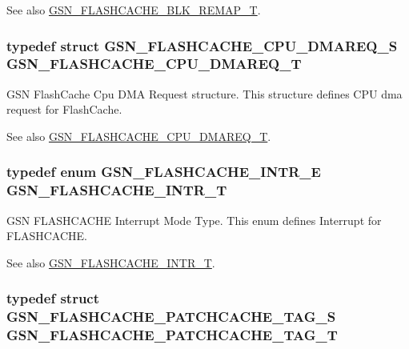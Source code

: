 \begin{DoxySeeAlso}{See also}
\hyperlink{a00646_gaae9fda1c44c958d868f7cf116897bfc5}{GSN\_\-FLASHCACHE\_\-BLK\_\-REMAP\_\-T}. 
\end{DoxySeeAlso}
\hypertarget{a00646_ga83166ab55332496f41890f891c0be919}{
\subsubsection[{GSN\_\-FLASHCACHE\_\-CPU\_\-DMAREQ\_\-T}]{\setlength{\rightskip}{0pt plus 5cm}typedef struct {\bf GSN\_\-FLASHCACHE\_\-CPU\_\-DMAREQ\_\-S}  {\bf GSN\_\-FLASHCACHE\_\-CPU\_\-DMAREQ\_\-T}}}
\label{a00646_ga83166ab55332496f41890f891c0be919}


GSN FlashCache Cpu DMA Request structure. This structure defines CPU dma request for FlashCache. 

\begin{DoxySeeAlso}{See also}
\hyperlink{a00646_ga83166ab55332496f41890f891c0be919}{GSN\_\-FLASHCACHE\_\-CPU\_\-DMAREQ\_\-T}. 
\end{DoxySeeAlso}
\hypertarget{a00646_gae440995d29864b6ceac3862a7d41a3d9}{
\subsubsection[{GSN\_\-FLASHCACHE\_\-INTR\_\-T}]{\setlength{\rightskip}{0pt plus 5cm}typedef enum {\bf GSN\_\-FLASHCACHE\_\-INTR\_\-E}  {\bf GSN\_\-FLASHCACHE\_\-INTR\_\-T}}}
\label{a00646_gae440995d29864b6ceac3862a7d41a3d9}


GSN FLASHCACHE Interrupt Mode Type. This enum defines Interrupt for FLASHCACHE. 

\begin{DoxySeeAlso}{See also}
\hyperlink{a00646_gae440995d29864b6ceac3862a7d41a3d9}{GSN\_\-FLASHCACHE\_\-INTR\_\-T}. 
\end{DoxySeeAlso}
\hypertarget{a00646_ga72a3a7e800a6f22cbb3fa9b744a51a72}{
\subsubsection[{GSN\_\-FLASHCACHE\_\-PATCHCACHE\_\-TAG\_\-T}]{\setlength{\rightskip}{0pt plus 5cm}typedef struct {\bf GSN\_\-FLASHCACHE\_\-PATCHCACHE\_\-TAG\_\-S}  {\bf GSN\_\-FLASHCACHE\_\-PATCHCACHE\_\-TAG\_\-T}}}
\label{a00646_ga72a3a7e800a6f22cbb3fa9b744a51a72}


